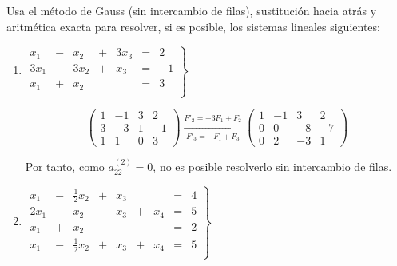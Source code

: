 \begin{ejercicio} Usa el método de Gauss (sin intercambio de filas), sustitución hacia atrás y aritmética exacta para resolver, si es posible, los sistemas lineales siguientes:
    \begin{enumerate}
        \item
        $ \displaystyle \left.
            \begin{array}{rrrrrrr}
                x_1 & - & x_2 & + & 3x_3 & = & 2  \\
                3x_1 & - & 3x_2 & + & x_3 & = & -1  \\
                x_1 & + & x_2 &  &  & = & 3  \\
            \end{array}
        \right\} $

        \begin{equation*}
        \left(\begin{array}{ccc|c}
            1 & -1 & 3 & 2\\
            3 & -3 & 1 & -1 \\
            1 & 1 & 0 & 3
        \end{array}
        \right) \xrightarrow[F'_3=-F_1 + F_3]{F'_2=-3F_1 + F_2}
        \left(\begin{array}{ccc|c}
            1 & -1 & 3 & 2\\
            0 & 0 & -8 & -7 \\
            0 & 2 & -3 & 1
        \end{array}
        \right)
        \end{equation*}

        Por tanto, como $a_{22}^{(2)} = 0$, no es posible resolverlo sin intercambio de filas.

        \item
        $ \displaystyle \left.
            \begin{array}{rrrrrrrrr}
                x_1 & - & \frac{1}{2}x_2 & + & x_3 & & & = & 4  \\
                2x_1 & - & x_2 & - & x_3 & + & x_4 & = & 5  \\
                x_1 & + & x_2 &  &  & & & = & 2  \\
                x_1 & - & \frac{1}{2}x_2 & + & x_3 & + & x_4 & = & 5  \\
            \end{array}
        \right\} $


\end{enumerate}
\end{ejercicio}
